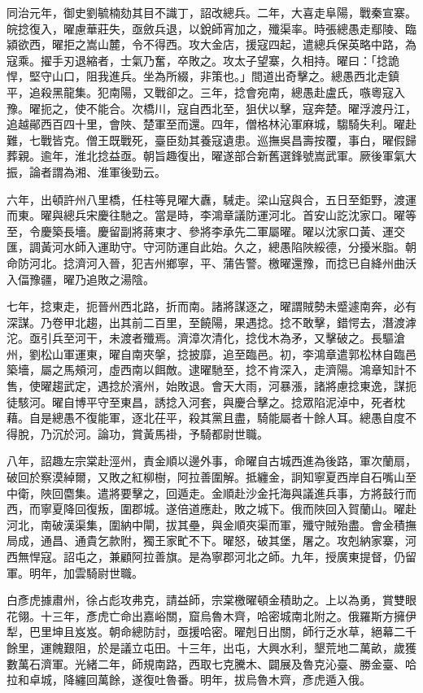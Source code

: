\begin{pinyinscope}
同治元年，御史劉毓楠劾其目不識丁，詔改總兵。二年，大喜走阜陽，戰秦宣寨。皖捻復入，曜慮華莊失，亟斂兵退，以銳師宵加之，殲渠率。時張總愚走鄢陵、臨潁欲西，曜拒之嵩山麓，令不得西。攻大金店，援寇四起，遣總兵保英略中路，為寇乘。擢手刃退縮者，士氣乃奮，卒敗之。攻太子望寨，久相持。曜曰：「捻詭悍，堅守山口，阻我進兵。坐為所綴，非策也。」間道出奇擊之。總愚西北走鎮平，追殺黑龍集。犯南陽，又戰卻之。三年，捻會宛南，總愚赴盧氏，嗾粵寇入豫。曜扼之，使不能合。次橋川，寇自西北至，狙伏以擊，寇奔楚。曜浮渡丹江，追越鄖西百四十里，會陜、楚軍至而還。四年，僧格林沁軍麻城，騶騎失利。曜赴難，七戰皆克。僧王既戰死，臺臣劾其養寇遺患。巡撫吳昌壽按覆，事白，曜假歸葬親。逾年，淮北捻益亟。朝旨趣復出，曜遂部合新舊選鋒號嵩武軍。厥後軍氣大振，論者謂為湘、淮軍後勁云。

六年，出頓許州八里橋，任柱等見曜大纛，駴走。梁山寇與合，五日至鉅野，渡運而東。曜與總兵宋慶往馳之。當是時，李鴻章議防運河北。首安山訖沈家口。曜等至，令慶築長墻。慶留副將蔣東才、參將李承先二軍屬曜。曜以沈家口黃、運交匯，調黃河水師入運助守。守河防運自此始。久之，總愚陷陜綏德，分擾米脂。朝命防河北。捻濟河入晉，犯吉州鄉寧，平、蒲告警。檄曜還豫，而捻已自絳州曲沃入偪豫疆，曜乃追敗之湯陰。

七年，捻東走，扼晉州西北路，折而南。諸將謀逐之，曜謂賊勢未蹙遽南奔，必有深謀。乃卷甲北趨，出其前二百里，至饒陽，果遇捻。捻不敢擊，錯愕去，潛渡滹沱。亟引兵至河干，未渡者殲焉。濟漳次清化，捻伐木為矛，又擊破之。長驅滄州，劉松山軍運東，曜自南夾搫，捻披靡，追至臨邑。初，李鴻章遣郭松林自臨邑築墻，屬之馬頰河，虛西南以餌敵。逮曜馳至，捻不肯深入，走濟陽。鴻章知計不售，使曜趨武定，遇捻於濱州，始敗退。會天大雨，河暴漲，諸將慮捻東逸，謀扼徒駭河。曜自博平守至東昌，誘捻入河套，與慶合擊之。捻眾陷泥淖中，死者枕藉。自是總愚不復能軍，逐北茌平，殺其黨且盡，騎能屬者十餘人耳。總愚自度不得脫，乃沉於河。論功，賞黃馬褂，予騎都尉世職。

八年，詔趣左宗棠赴涇州，責金順以邊外事，命曜自古城西進為後路，軍次蘭扇，破回於察漠綽爾，又敗之紅柳樹，阿拉善圍解。抵纏金，詗知寧夏西岸自石嘴山至中衛，陜回麕集。遣將要擊之，回遁走。金順赴沙金托海與議進兵事，方將鼓行而西，而寧夏降回復叛，圍郡城。遂倍道應赴，敗之城下。俄而陜回入賀蘭山。曜赴河北，南破漢渠集，圍納中閘，拔其壘，與金順夾渠而軍，殲守賊殆盡。會金積撫局成，通昌、通貴乞款附，獨王家甿不下。曜怒，破其堡，屠之。攻剋納家寨，河西無悍寇。詔屯之，兼顧阿拉善旗。是為寧郡河北之師。九年，授廣東提督，仍留軍。明年，加雲騎尉世職。

白彥虎據肅州，徐占彪攻弗克，請益師，宗棠檄曜頓金積助之。上以為勇，賞雙眼花翎。十三年，彥虎亡命出嘉峪關，窟烏魯木齊，哈密城南北附之。俄羅斯方擁伊犁，巴里坤且岌岌。朝命總防討，亟援哈密。曜剋日出關，師行乏水草，絕幕二千餘里，運餽艱阻，於是議立屯田。十三年，出屯，大興水利，墾荒地二萬畝，歲獲數萬石濟軍。光緒二年，師規南路，西取七克騰木、闢展及魯克沁臺、勝金臺、哈拉和卓城，降纏回萬餘，遂復吐魯番。明年，拔烏魯木齊，彥虎遁入俄。


\end{pinyinscope}
